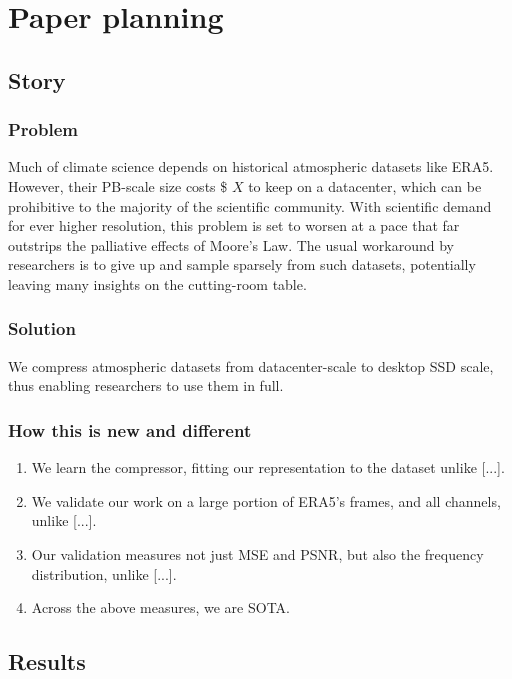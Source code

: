 
\section{Paper planning}

\subsection{Story}
\subsubsection{Problem}

Much of climate science depends on historical atmospheric datasets like ERA5. However, their PB-scale size costs \$ $X$ to keep on a datacenter, which can be prohibitive to the majority of the scientific community. With scientific demand for ever higher resolution, this problem is set to worsen at a pace that far outstrips the palliative effects of Moore's Law. The usual workaround by researchers is to give up and sample sparsely from such datasets, potentially leaving many insights on the cutting-room table.

\subsubsection{Solution} 
We compress atmospheric datasets from datacenter-scale to desktop SSD scale, thus enabling researchers to use them in full.

\subsubsection{How this is new and different}
\begin{enumerate}
\item We learn the compressor, fitting our representation to the dataset unlike [...].
\item We validate our work on a large portion of ERA5's frames, and all channels, unlike [...].
\item Our validation measures not just MSE and PSNR, but also the frequency distribution, unlike [...].
\item Across the above measures, we are SOTA.
\end{enumerate}

\subsection{Results}
